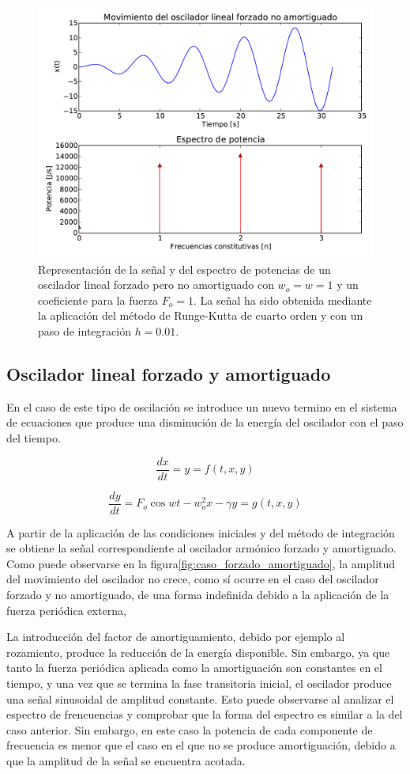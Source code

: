 \documentclass[11pt]{article}
\begin{document}
\begin{figure}
\centering
\includegraphics[width=0.75\linewidth]{caso_forzado.pdf}
\caption{Representación de la señal y del espectro de potencias de un oscilador
lineal forzado pero no amortiguado con $w_o = w = 1$ y un coeficiente para la
fuerza $F_o = 1$. La señal ha sido obtenida mediante la aplicación del método de
Runge-Kutta de cuarto orden y con un paso de integración $h = 0.01$.}
\label{fig:caso_forzado}
\end{figure}

\subsection{Oscilador lineal forzado y amortiguado}
En el caso de este tipo de oscilación se introduce un nuevo termino en el
sistema de ecuaciones que produce una disminución de la energía del oscilador
con el paso del tiempo.

\begin{equation}
	\frac{dx}{dt} = y = f(t, x, y)
\end{equation}

\begin{equation}
	\frac{dy}{dt} = F_o\cos{wt} - w_o^2 x - \gamma{}y = g(t, x, y) 	
\end{equation}

A partir de la aplicación de las condiciones iniciales y del método de
integración se obtiene la señal correspondiente al oscilador armónico forzado y
amortiguado. Como puede observarse en la figura\ref{fig:caso_forzado_amortiguado},
la amplitud del movimiento del oscilador no crece, como sí ocurre en el caso del
oscilador forzado y no amortiguado, de una forma indefinida debido a la 
aplicación de la fuerza periódica externa,

La introducción del factor de amortiguamiento, debido por ejemplo al rozamiento,
produce la reducción de la energía disponible. Sin embargo, ya que tanto la
fuerza periódica aplicada como la amortiguación son constantes en el tiempo, y
una vez que se termina la fase transitoria inicial, el oscilador produce una
señal sinusoidal de amplitud constante. Esto puede observarse al analizar el
espectro de frencuencias y comprobar que la forma del espectro es similar a la
del caso anterior. Sin embargo, en este caso la potencia de cada componente de
frecuencia es menor que el caso en el que no se produce amortiguación, debido a
que la amplitud de la señal se encuentra acotada.
\end{document}
